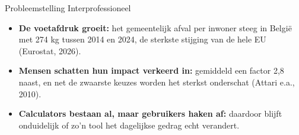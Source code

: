 \documentclass[aspectratio=169]{beamer}
\begin{document}
\begin{frame}{Probleemstelling Interprofessioneel}
    
    \vspace{5pt}
    
    \begin{tcolorbox}[colback=colortwo, colframe=colorsix, width=.8\textwidth]
        \begin{itemize}[label=\textcolor{colorsix}{$\blacktriangleright$}]
            \item \textcolor{colorsix}{\textbf{De voetafdruk groeit:} het gemeentelijk afval per inwoner steeg in België met 274 kg tussen 2014 en 2024, de sterkste stijging van de hele EU (Eurostat, \textcolor{linkblue}{2026}).}
            \item \textcolor{colorsix}{\textbf{Mensen schatten hun impact verkeerd in:} gemiddeld een factor 2,8 naast, en net de zwaarste keuzes worden het sterkst onderschat (Attari e.a., \textcolor{linkblue}{2010}).}
            \item \textcolor{colorsix}{\textbf{Calculators bestaan al, maar gebruikers haken af:} daardoor blijft onduidelijk of zo'n tool het dagelijkse gedrag echt verandert.}
        \end{itemize}
    \end{tcolorbox}
    
\end{frame}
\end{document}
